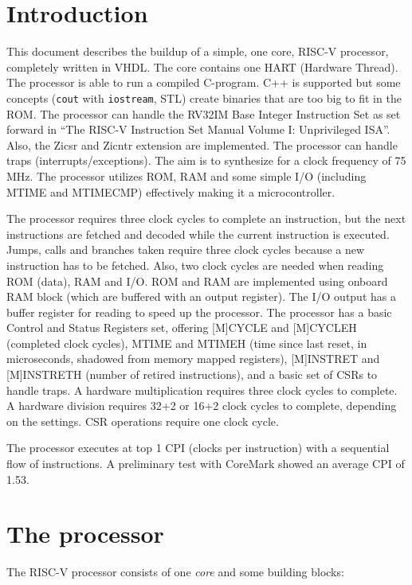 \documentclass[12pt]{article}
\begin{document}
\section{Introduction}
This document describes the buildup of a simple, one core, RISC-V processor, completely written in VHDL. The core contains one HART (Hardware Thread). The processor is able to run a compiled C-program. C++ is supported but some concepts (\texttt{cout} with \texttt{iostream}, STL) create binaries that are too big to fit in the ROM. The processor can handle the RV32IM Base Integer Instruction Set as set forward in ``The RISC-V Instruction Set Manual Volume I: Unprivileged ISA''. Also, the Zicsr and Zicntr extension are implemented. The processor can handle traps (interrupts/exceptions). The aim is to synthesize for a clock frequency of 75\,MHz. The processor utilizes ROM, RAM and some simple I/O (including MTIME and MTIMECMP) effectively making it a microcontroller.

The processor requires three clock cycles to complete an instruction, but the next instructions are fetched and decoded while the current instruction is executed. Jumps, calls and branches taken require three clock cycles because a new instruction has to be fetched. Also, two clock cycles are needed when reading ROM (data), RAM and I/O. ROM and RAM are implemented using onboard RAM block (which are buffered with an output register). The I/O output has a buffer register for reading to speed up the processor. The processor has a basic Control and Status Registers set, offering [M]CYCLE and [M]CYCLEH (completed clock cycles), MTIME and MTIMEH (time since last reset, in microseconds, shadowed from memory mapped registers), [M]INSTRET and [M]INSTRETH (number of retired instructions), and a basic set of CSRs to handle traps. A hardware multiplication requires three clock cycles to complete. A hardware division requires 32+2 or 16+2 clock cycles to complete, depending on the settings. CSR operations require one clock cycle.

The processor executes at top 1 CPI (clocks per instruction) with a sequential flow of instructions. A preliminary test with CoreMark showed an average CPI of 1.53.

\section{The processor}
The RISC-V processor consists of one \textit{core} and some building blocks:
\end{document}
